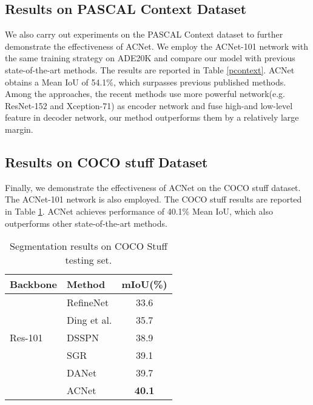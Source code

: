 \documentclass[10pt,twocolumn,letterpaper]{article}
\begin{document}
\subsection{Results on PASCAL Context  Dataset }

We also carry out experiments on the PASCAL Context dataset to further demonstrate the effectiveness of  ACNet.  We employ the ACNet-101 network with the same
training strategy on ADE20K and compare our model with previous state-of-the-art methods.
The results are  reported in Table \ref{pcontext}. ACNet obtains a Mean IoU of 54.1\%, which surpasses previous published methods.
Among the approaches, the recent methods\cite{Lin_2018_ECCV,CVPR19Tian7} use more powerful network(e.g. ResNet-152 and Xception-71) as encoder network  and  fuse high-and low-level feature in decoder network, our method outperforms them  by  a relatively large margin. 


\subsection{Results on  COCO stuff Dataset }

Finally, we  demonstrate the effectiveness of  ACNet on the COCO stuff dataset.  The ACNet-101 network is also employed. The COCO stuff  results are  reported in Table \ref{cocostuff}. ACNet  achieves performance of 40.1\% Mean IoU, which also outperforms other state-of-the-art methods. 
 
\begin{table}[t]
\begin{center}
\begin{tabular} {l |l | c }
    \toprule[1pt]
    Backbone & Method & mIoU(\%)\\
    \hline \hline
    \multirow{5}{*}{Res-101}
    &RefineNet  \cite{refinenet} &  33.6 \\
    &Ding et al.\cite{ding2018context} &  35.7 \\
   &DSSPN\cite{liang2018dynamic}  &  38.9 \\
 &SGR \cite{liang2018symbolic}&39.1\\
   &DANet\cite{fu2018dual} & 39.7 \\
    &    ACNet & \textbf{40.1} \\
       \hline
    \bottomrule[1pt]
 \end{tabular}
\end{center}
\caption{Segmentation results on COCO Stuff testing set.}
\vspace{-1em}
\label{cocostuff}
\end{table}
\end{document}
